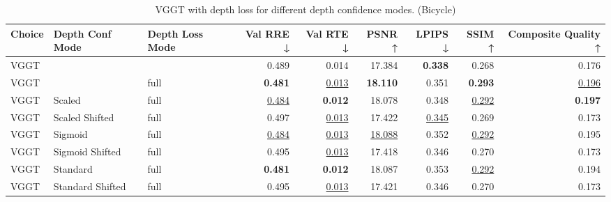 \begin{table}[H]
\caption{\ifdefined\customcaption \customcaption \else VGGT with depth loss for different depth confidence modes. (Bicycle) \fi}
\label{tab:05_depth_conf_mode_bicycle}
\centering
\scriptsize
\begin{tabular}{lllrrrrrr}
\toprule
Choice & Depth Conf Mode & Depth Loss Mode & Val RRE ↓ & Val RTE ↓ & PSNR ↑ & LPIPS ↓ & SSIM ↑ & Composite Quality ↑ \\
\midrule
VGGT &  &  & 0.489 & 0.014 & 17.384 & \textbf{0.338} & 0.268 & 0.176 \\
VGGT &  & full & \textbf{0.481} & \underline{0.013} & \textbf{18.110} & 0.351 & \textbf{0.293} & \underline{0.196} \\
VGGT & Scaled & full & \underline{0.484} & \textbf{0.012} & 18.078 & 0.348 & \underline{0.292} & \textbf{0.197} \\
VGGT & Scaled Shifted & full & 0.497 & \underline{0.013} & 17.422 & \underline{0.345} & 0.269 & 0.173 \\
VGGT & Sigmoid & full & \underline{0.484} & \underline{0.013} & \underline{18.088} & 0.352 & \underline{0.292} & 0.195 \\
VGGT & Sigmoid Shifted & full & 0.495 & \underline{0.013} & 17.418 & 0.346 & 0.270 & 0.173 \\
VGGT & Standard & full & \textbf{0.481} & \textbf{0.012} & 18.087 & 0.353 & \underline{0.292} & 0.194 \\
VGGT & Standard Shifted & full & 0.495 & \underline{0.013} & 17.421 & 0.346 & 0.270 & 0.173 \\
\bottomrule
\end{tabular}
\end{table}